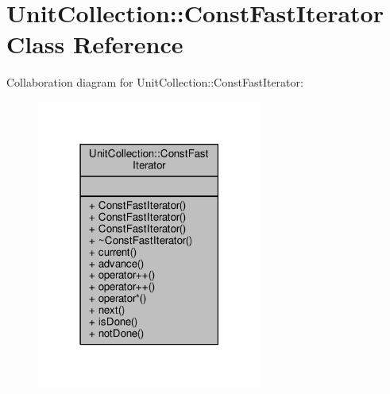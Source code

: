 \hypertarget{classUnitCollection_1_1ConstFastIterator}{}\section{Unit\+Collection\+:\+:Const\+Fast\+Iterator Class Reference}
\label{classUnitCollection_1_1ConstFastIterator}


Collaboration diagram for Unit\+Collection\+:\+:Const\+Fast\+Iterator\+:
\nopagebreak
\begin{figure}[H]
\begin{center}
\leavevmode
\includegraphics[width=210pt]{d9/dea/classUnitCollection_1_1ConstFastIterator__coll__graph}
\end{center}
\end{figure}
